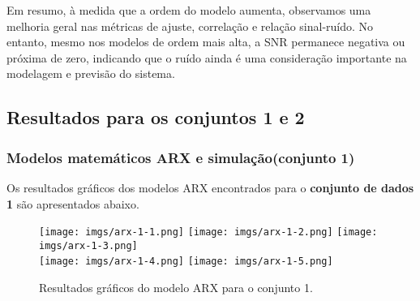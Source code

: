 \documentclass[a4paper,12pt]{article}
\begin{document}
Em resumo, à medida que a ordem do modelo aumenta, observamos uma melhoria geral nas métricas de ajuste, correlação e relação sinal-ruído. No entanto, mesmo nos modelos de ordem mais alta, a SNR permanece negativa ou próxima de zero, indicando que o ruído ainda é uma consideração importante na modelagem e previsão do sistema.

\subsection{Resultados para os conjuntos 1 e 2}

\subsubsection{Modelos matemáticos ARX e simulação(conjunto 1)}

Os resultados gráficos dos modelos ARX encontrados para o \textbf{conjunto de dados 1} são apresentados abaixo.

\begin{figure}[h!]
\centering

\texttt{[image: imgs/arx-1-1.png]} \quad
\texttt{[image: imgs/arx-1-2.png]} \quad
\texttt{[image: imgs/arx-1-3.png]} \\

\texttt{[image: imgs/arx-1-4.png]} \quad
\texttt{[image: imgs/arx-1-5.png]}

\caption{Resultados gráficos do modelo ARX para o conjunto 1.}
\end{figure}
\end{document}
